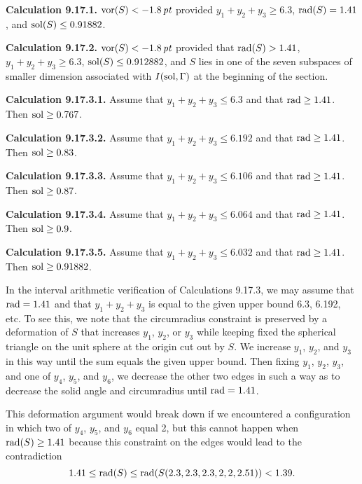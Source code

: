 {\bf Calculation 9.17.1.}  $\operatorname{vor}(S)<-1.8\,\hbox{\it pt}$ provided 
$y_1+y_2+y_3\ge 6.3$, $\operatorname{rad}(S)=1.41$, and $\operatorname{sol}(S)\le 0.91882$.

{\bf Calculation 9.17.2.}  $\operatorname{vor}(S)<-1.8\,\hbox{\it pt}$\/ provided that
$\operatorname{rad}(S)>1.41$, 
$y_1+y_2+y_3\ge 6.3$,
$\operatorname{sol}(S)\le 0.912882$, and $S$ lies in one of
the seven subspaces of smaller dimension associated with $I(\operatorname{sol},\Gamma)$
at the beginning of the section.




{\bf Calculation 9.17.3.1.}  Assume that $y_1+y_2+y_3\le 6.3$
and that $\operatorname{rad}\ge1.41$. Then $\operatorname{sol}\ge 0.767$.

{\bf Calculation 9.17.3.2.} Assume that $y_1+y_2+y_3\le 6.192$
and that $\operatorname{rad}\ge1.41$.  Then $\operatorname{sol}\ge 0.83$.

{\bf Calculation 9.17.3.3.}  Assume that $y_1+y_2+y_3\le 6.106$
and that $\operatorname{rad}\ge1.41$.  Then $\operatorname{sol}\ge 0.87$.

{\bf Calculation 9.17.3.4.}  Assume that $y_1+y_2+y_3\le 6.064$
and that $\operatorname{rad}\ge1.41$.  Then $\operatorname{sol}\ge 0.9$.

{\bf Calculation 9.17.3.5.}  Assume that $y_1+y_2+y_3\le 6.032$
and that $\operatorname{rad}\ge1.41$.  Then $\operatorname{sol}\ge 0.91882$.

In the interval arithmetic verification of Calculations
9.17.3, we may assume that $\operatorname{rad}=1.41$ and
that $y_1+y_2+y_3$ is equal to the given upper bound
6.3, 6.192, etc.  To see this, we note that the circumradius
constraint is preserved by a deformation of $S$ that
increases $y_1$, $y_2$, or $y_3$ while keeping fixed
the spherical triangle on the unit sphere at the origin
cut out by $S$.
 We increase $y_1$, $y_2$,
and $y_3$ in this way
until the sum equals the given upper bound.
Then fixing $y_1$, $y_2$, $y_3$, and
one of $y_4$, $y_5$, and $y_6$, we decrease
the other two edges
in such a way as to decrease the solid angle
and circumradius until $\operatorname{rad}=1.41$.

This deformation argument would break down if we encountered
a configuration in which two of $y_4$, $y_5$, and $y_6$ equal
2, but this cannot happen when $\operatorname{rad}(S)\ge 1.41$ because this
constraint on the edges would lead to the contradiction
$$1.41\le\operatorname{rad}(S)\le \operatorname{rad}(S(2.3,2.3,2.3,2,2,2.51))<1.39.$$

